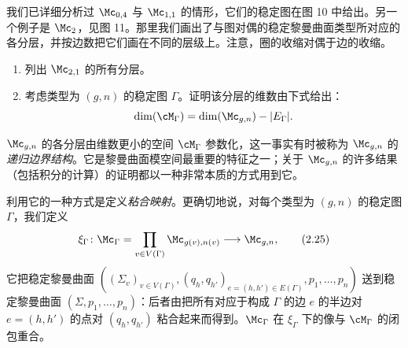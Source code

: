 我们已详细分析过 $\Mc_{0,4}$ 与 $\Mc_{1,1}$ 的情形，它们的稳定图在图 10 中给出。另一个例子是 $\Mc_2$，见图 11。那里我们画出了与图对偶的稳定黎曼曲面类型所对应的各分层，并按边数把它们画在不同的层级上。注意，圈的收缩对偶于边的收缩。


\begin{exercise}[2.4]
  \begin{enumerate}
    \item 列出 $\Mc_{2,1}$ 的所有分层。
    \item 考虑类型为 $(g,n)$ 的稳定图 $\Gamma$。证明该分层的维数由下式给出：
    \[
      \dim(\cM_\Gamma)=\dim(\Mc_{g,n})-|E_\Gamma|.
    \]
  \end{enumerate}
\end{exercise}


$\Mc_{g,n}$ 的各分层由维数更小的空间 $\cM_\Gamma$ 参数化，这一事实有时被称为 $\Mc_{g,n}$ 的\emph{递归边界结构}。它是黎曼曲面模空间最重要的特征之一；关于 $\Mc_{g,n}$ 的许多结果（包括积分的计算）的证明都以一种非常本质的方式用到它。


利用它的一种方式是定义\emph{粘合映射}。更确切地说，对每个类型为 $(g,n)$ 的稳定图 $\Gamma$，我们定义
\begin{equation}
  \xi_\Gamma\colon\Mc_\Gamma=\prod_{v\in V(\Gamma)}\Mc_{g(v),n(v)}\longrightarrow\Mc_{g,n},
  \tag{2.25}
\end{equation}
它把稳定黎曼曲面 $((\Sigma_v)_{v\in V(\Gamma)},(q_h,q_{h'})_{e=(h,h')\in E(\Gamma)},p_1,\dots,p_n)$ 送到稳定黎曼曲面 $(\Sigma,p_1,\dots,p_n)$：后者由把所有对应于构成 $\Gamma$ 的边 $e$ 的半边对 $e=(h,h')$ 的点对 $(q_h,q_{h'})$ 粘合起来而得到。$\Mc_\Gamma$ 在 $\xi_\Gamma$ 下的像与 $\cM_\Gamma$ 的闭包重合。

